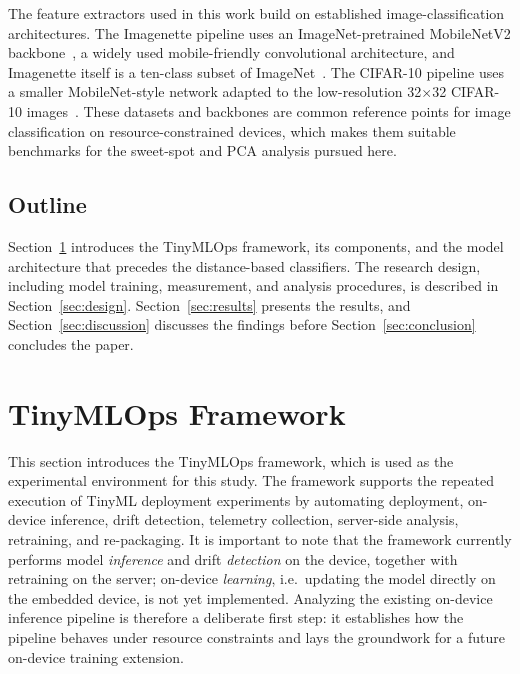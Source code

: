 \documentclass[sigconf,review]{acmart}
\begin{document}
The feature extractors used in this work build on established image-classification architectures.
The Imagenette pipeline uses an ImageNet-pretrained MobileNetV2 backbone~\cite{sandler2018mobilenetv2}, a widely used mobile-friendly convolutional architecture, and Imagenette itself is a ten-class subset of ImageNet~\cite{deng2009imagenet,howard2019imagenette}.
The CIFAR-10 pipeline uses a smaller MobileNet-style network adapted to the low-resolution 32$\times$32 CIFAR-10 images~\cite{krizhevsky2009cifar}.
These datasets and backbones are common reference points for image classification on resource-constrained devices, which makes them suitable benchmarks for the sweet-spot and PCA analysis pursued here.

\subsection{Outline}
Section~\ref{sec:framework} introduces the TinyMLOps framework, its components, and the model architecture that precedes the distance-based classifiers.
The research design, including model training, measurement, and analysis procedures, is described in Section~\ref{sec:design}.
Section~\ref{sec:results} presents the results, and Section~\ref{sec:discussion} discusses the findings before Section~\ref{sec:conclusion} concludes the paper.

\section{TinyMLOps Framework}
\label{sec:framework}
This section introduces the TinyMLOps framework, which is used as the experimental environment for this study.
The framework supports the repeated execution of TinyML deployment experiments by automating deployment, on-device inference, drift detection, telemetry collection, server-side analysis, retraining, and re-packaging.
It is important to note that the framework currently performs model \emph{inference} and drift \emph{detection} on the device, together with retraining on the server; on-device \emph{learning}, i.e.\ updating the model directly on the embedded device, is not yet implemented.
Analyzing the existing on-device inference pipeline is therefore a deliberate first step: it establishes how the pipeline behaves under resource constraints and lays the groundwork for a future on-device training extension.
\end{document}
